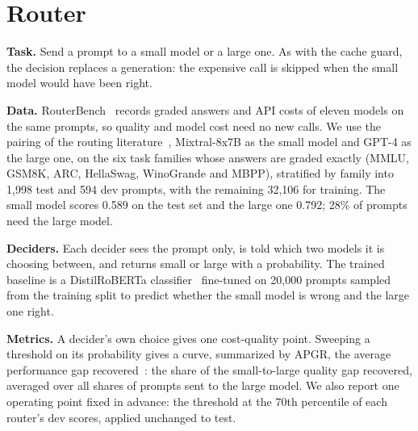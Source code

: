 \section{Router}
\label{sec:router}

\textbf{Task.} Send a prompt to a small model or a large one.
As with the cache guard, the decision replaces a generation: the expensive call is skipped when the small model would have been right.

\textbf{Data.} RouterBench~\cite{hu2024routerbench} records graded answers and API costs of eleven models on the same prompts, so quality and model cost need no new calls.
We use the pairing of the routing literature~\cite{ong2024routellm}, Mixtral-8x7B as the small model and GPT-4 as the large one, on the six task families whose answers are graded exactly (MMLU, GSM8K, ARC, HellaSwag, WinoGrande and MBPP), stratified by family into 1,998 test and 594 dev prompts, with the remaining 32,106 for training.
The small model scores 0.589 on the test set and the large one 0.792; 28\% of prompts need the large model.

\textbf{Deciders.} Each decider sees the prompt only, is told which two models it is choosing between, and returns small or large with a probability.
The trained baseline is a DistilRoBERTa classifier~\cite{sanh2019distilbert} fine-tuned on 20,000 prompts sampled from the training split to predict whether the small model is wrong and the large one right.

\textbf{Metrics.} A decider's own choice gives one cost-quality point.
Sweeping a threshold on its probability gives a curve, summarized by APGR, the average performance gap recovered~\cite{ong2024routellm}: the share of the small-to-large quality gap recovered, averaged over all shares of prompts sent to the large model.
We also report one operating point fixed in advance: the threshold at the 70th percentile of each router's dev scores, applied unchanged to test.

